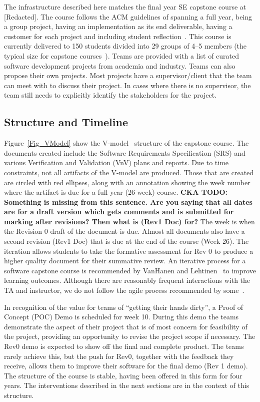 \documentclass[10pt, conference]{IEEEtran}
\begin{document}
The infrastructure described here matches the final year SE capstone course at
[Redacted]. %
The course follows the ACM guidelines of spanning a full year, being a group
project, having an implementation as its end deliverable, having a customer for each
project and including student reflection~\cite{ACM2015}.  This course is
currently delivered to 150 students divided into 29 groups of 4--5 members (the
typical size for capstone
courses~\cite{tenhunenSystematicLiteratureReview2023}).  Teams are provided with
a list of curated software development projects from academia and industry.
Teams can also propose their own projects.  Most projects have a
supervisor/client that the team can meet with to discuss their project.  In
cases where there is no supervisor, the team still needs to explicitly identify
the stakeholders for the project.

\subsection{Structure and Timeline} \label{Sec_Structure}

Figure~\ref{Fig_VModel} show the V-model~\cite{ForsbergAndMooz1991} structure of
the capstone course. The documents created include the Software Requirements
Specification (SRS) and various Verification and Validation (VnV) plans and
reports. Due to time constraints, not all artifacts of the V-model are produced.
Those that are created are circled with red ellipses, along with an annotation
showing the week number where the artifact is due for a full year (26 week)
course. 
\textbf{CKA TODO:  Something is missing from this sentence.  Are you saying that all dates are for a draft version which gets comments and is submitted for marking after revisions?  Then what is (Rev1 Doc) for?}
The week is when the Revision 0 draft of the document is due.  Almost
all documents also have a second revision (Rev1 Doc) that is due at the end of
the course (Week 26). The iteration allows students to take the formative
assessment for Rev 0 to produce a higher quality document for their summative
review. An iterative process for a software capstone course is recommended by
VanHanen and Lehtinen~\cite{vanhanenSoftwareEngineeringProblems2014} to improve
 learning outcomes. Although there are reasonably frequent interactions with
the TA and instructor, we do not follow the agile process recommended by
some~\cite{stettinaAcademicEducationSoftware2013,
bastarricaWhatCanStudents2017}.

In recognition of the value for teams of ``getting their hands dirty'',
a Proof of Concept (POC) Demo is scheduled for week 10. During this demo the
teams demonstrate the aspect of their project that is of most concern for
feasibility of the project, providing an opportunity to revise the project scope
if necessary. The Rev0 demo is expected to show off the final and complete
product. The teams rarely achieve this, but the push for Rev0, together with the
feedback they receive, allows them to improve their software for the final demo
(Rev 1 demo). The structure of the course is stable, having been offered in this
form for four years. The interventions described in the next sections are in the
context of this structure. 
\end{document}
